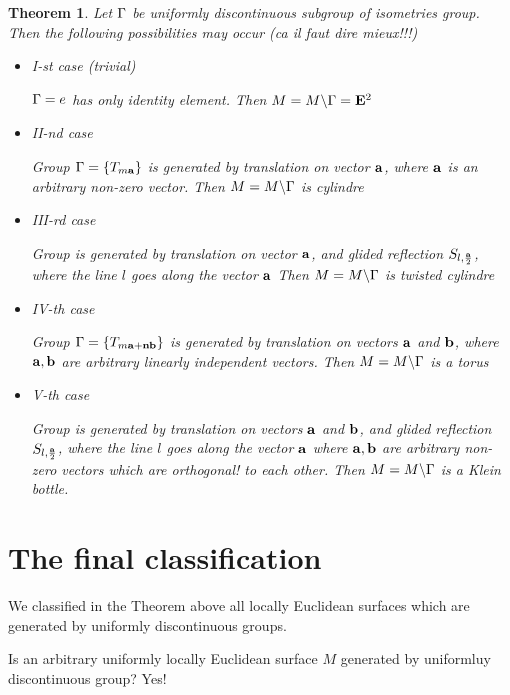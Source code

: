 \documentclass[12pt]{article}
\newtheorem{theorem}{Theorem}
\theoremstyle{definition}
\numberwithin{equation}{section}
\begin{document}
 \begin{theorem}  Let ${\Gamma}$ be uniformly discontinuous
subgroup of isometries group. Then the following possibilities
may occur ({\it ca il faut dire mieux!!!})

\begin{itemize}

\item
I-st case (trivial)

${\Gamma}={e}$ has only identity element. Then $M=M\backslash {\Gamma}={\bf E}^2$ 

\item
II-nd case 


Group ${\Gamma}=\{T_{m{\bf a}}\}$
is generated by translation on vector ${\bf a}$,
where ${\bf a}$ is an arbitrary non-zero vector.
Then $M=M\backslash {\Gamma}$ is cylindre 

\item
III-rd  case 


Group 
is generated by translation on vector ${\bf a}$,
and glided reflection $S_{l,{{\bf a}\over 2}}$,
where the line
$l$ goes along the vector ${\bf a}$
Then $M=M\backslash {\Gamma}$ is twisted cylindre 

\item
IV-th case 


Group ${\Gamma}=\{T_{m{\bf a}+{\bf n}{\bf b}}\}$
is generated by translation on vectors ${\bf a}$
and ${\bf b}$,
where ${\bf a},{\bf b}$ are  arbitrary linearly independent vectors.
Then $M=M\backslash {\Gamma}$ is a torus

\item
V-th case 


Group
is generated by translation on vectors ${\bf a}$
and ${\bf b}$, and glided reflection $S_{l,{{\bf a}\over 2}}$,
where the line
$l$ goes along the vector ${\bf a}$
where ${\bf a},{\bf b}$ are  arbitrary non-zero vectors which are
{\it orthogonal!} to each other.
Then $M=M\backslash {\Gamma}$ is a Klein bottle.

\end{itemize}
\end{theorem}

\section {The final classification}

We classified in the Theorem above all 
locally Euclidean surfaces which are generated
by uniformly discontinuous groups.

Is an arbitrary uniformly locally Euclidean surface
$M$ generated by uniformluy discontinuous group?
  Yes!
\end{document}
